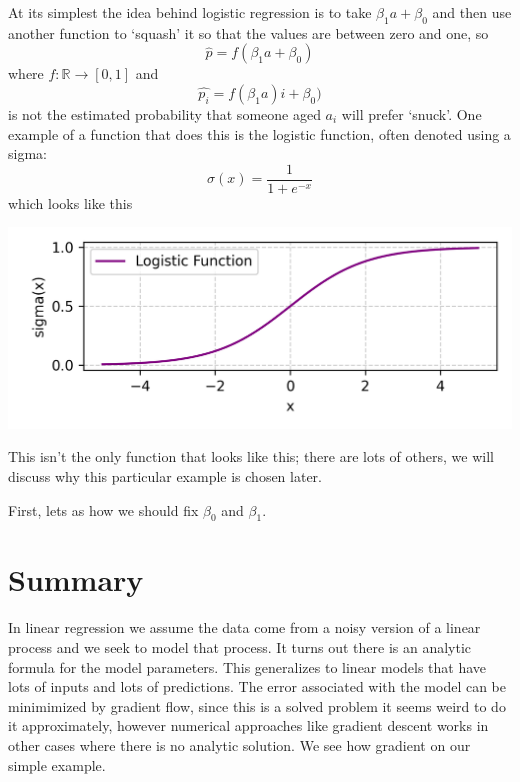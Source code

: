\documentclass[12pt]{article}
\begin{document}
At its simplest the idea behind logistic regression is to take
$\beta_1a+\beta_0$ and then use another function to `squash' it so
that the values are between zero and one, so
\begin{equation}
\hat{p}=f(\beta_1 a+\beta_0)
\end{equation}
where $f:\mathbb{R}\rightarrow[0,1]$ and
\begin{equation}
\hat{p_i}=f(\beta_1 a)i+\beta_0)
\end{equation}
is not the estimated probability that someone aged $a_i$ will prefer
`snuck'. One example of a function that does this is the logistic
function, often denoted using a sigma:
\begin{equation}
  \sigma(x)=\frac{1}{1+e^{-x}}
\end{equation}
which looks like this
\begin{center}
  \includegraphics[]{02.4_logistic.png}
\end{center}
This isn't the only function that looks like this; there are lots of
others, we will discuss why this particular example is chosen later.

First, lets as how we should fix $\beta_0$ and $\beta_1$.



\section*{Summary}
In linear regression we assume the data come from a noisy version of a
linear process and we seek to model that process. It turns out there
is an analytic formula for the model parameters. This generalizes to
linear models that have lots of inputs and lots of predictions. The
error associated with the model can be minimimized by gradient flow,
since this is a solved problem it seems weird to do it approximately,
however numerical approaches like gradient descent works in other
cases where there is no analytic solution. We see how gradient on our
simple example.
\end{document}
